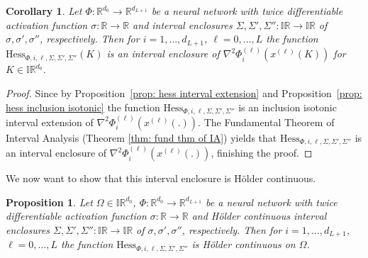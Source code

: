 \documentclass[a4paper, 11pt]{article}
\newtheorem{proposition}[theorem]{Proposition}
\newtheorem{corollary}[theorem]{Corollary}
\begin{document}
	
	\begin{corollary}\label{cor: hess int encl}
		Let $\Phi : \mathbb{R}^{d_0} \to \mathbb{R}^{d_{L+1}}$ be a neural network with twice differentiable activation function $\sigma : \mathbb{R} \to \mathbb{R}$ and interval enclosures $\Sigma,\Sigma',\Sigma'':\mathbb{IR}\to \mathbb{IR}$ of $\sigma,\sigma',\sigma''$, respectively. Then for $i=1, \dotsc, d_{L+1}$, $\ell=0,\dotsc,L$ the function $\mathrm{Hess}_{\Phi,i,\ell, \Sigma, \Sigma',\Sigma''}(K)$ is an interval enclosure of $\nabla^2\Phi_i^{(\ell)}(x^{(\ell)}(K))$ for $K\in \mathbb{IR}^{d_0}$.
	\end{corollary}
	\begin{proof}
		Since by Proposition~\ref{prop: hess interval extension} and Proposition~\ref{prop: hess inclusion isotonic} the function $\mathrm{Hess}_{\Phi,i,\ell, \Sigma, \Sigma',\Sigma''}$ is an inclusion isotonic interval extension of $\nabla^2\Phi_i^{(\ell)}(x^{(\ell)}(.))$. The Fundamental Theorem of Interval Analysis (Theorem \ref{thm: fund thm of IA}) yields that $\mathrm{Hess}_{\Phi,i,\ell, \Sigma, \Sigma', \Sigma''}$ is an interval enclosure of $\nabla^2\Phi_i^{(\ell)}(x^{(\ell)}(.))$, finishing the proof.
	\end{proof}
	
	We now want to show that this interval enclosure is Hölder continuous.
	
	\begin{proposition}\label{prop: hess hölder}
		Let $\Omega \in \mathbb{IR}^{d_0}$, $\Phi : \mathbb{R}^{d_0} \to \mathbb{R}^{d_{L+1}}$ be a neural network with twice differentiable activation function $\sigma : \mathbb{R} \to \mathbb{R}$ and Hölder continuous interval enclosures $\Sigma,\Sigma',\Sigma'':\mathbb{IR}\to \mathbb{IR}$ of $\sigma,\sigma',\sigma''$, respectively. Then for $i=1, \dotsc, d_{L+1}$, $\ell=0,\dotsc,L$ the function $\mathrm{Hess}_{\Phi,i,\ell, \Sigma, \Sigma', \Sigma''}$ is Hölder continuous on $\Omega$.
	\end{proposition}
	
\end{document}
